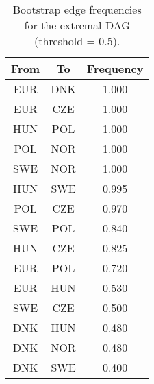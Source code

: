 \begin{table}[!h]
\centering
\caption{Bootstrap edge frequencies for the extremal DAG (threshold = 0.5).}
\centering
\begin{tabular}[t]{ccc}
\toprule
From & To & Frequency\\
\midrule
EUR & DNK & 1.000\\
EUR & CZE & 1.000\\
HUN & POL & 1.000\\
POL & NOR & 1.000\\
SWE & NOR & 1.000\\
\addlinespace
HUN & SWE & 0.995\\
POL & CZE & 0.970\\
SWE & POL & 0.840\\
HUN & CZE & 0.825\\
EUR & POL & 0.720\\
\addlinespace
EUR & HUN & 0.530\\
SWE & CZE & 0.500\\
DNK & HUN & 0.480\\
DNK & NOR & 0.480\\
DNK & SWE & 0.400\\
\bottomrule
\end{tabular}
\end{table}
